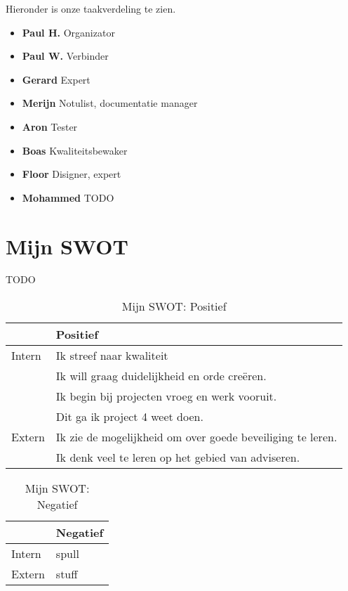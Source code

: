 \documentclass{article}
\begin{document}
Hieronder is onze taakverdeling te zien.

\begin{itemize}
  \item \textbf{Paul H.}  Organizator
  \item \textbf{Paul W.}  Verbinder 
  \item \textbf{Gerard} Expert 
  \item \textbf{Merijn} Notulist, documentatie manager
  \item \textbf{Aron} Tester
  \item \textbf{Boas} Kwaliteitsbewaker 
  \item \textbf{Floor} Disigner, expert
  \item \textbf{Mohammed} TODO
\end{itemize}

\section{Mijn SWOT}

TODO

\begin{table}[h!]
\caption{Mijn SWOT: Positief}
\label{tab: Mijn SWOT: Positief}
\begin{tabular}{l|l}
        & \textbf{Positief} \\
        \hline
        {Intern} 	& Ik streef naar kwaliteit \\ 
			& Ik will graag duidelijkheid en orde cre\"eren. \\
			& Ik begin bij projecten vroeg en werk vooruit. \\
			& Dit ga ik project 4 weet doen. \\
        {Extern}	& Ik zie de mogelijkheid om over goede beveiliging te leren. \\ 
			& Ik denk veel te leren op het gebied van adviseren. \\
\end{tabular}
\end{table}

\begin{table}[h!]
\caption{Mijn SWOT: Negatief}
\label{tab: Mijn SWOT: Negatief}
\begin{tabular}{l|l}
        & \textbf{Negatief} \\
        \hline
        {Intern} 	& spull \\ 
        {Extern}	& stuff \\ 
\end{tabular}
\end{table}
\end{document}
